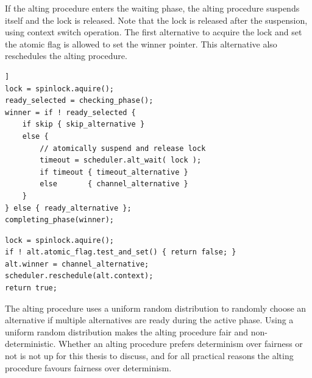 If the alting procedure enters the waiting phase, the alting procedure suspends itself and the lock is released. Note that the lock is released after the suspension, using context switch operation.  The first alternative to acquire the lock and set the atomic flag is allowed to set the winner pointer. This alternative also reschedules the alting procedure.

\begin{lstfloat}
\begin{lstlisting}[caption={Active alting of the alting procedure.}, label={lst:active_alting}, style={CustomC++}, xleftmargin={2em}]]
lock = spinlock.aquire();
ready_selected = checking_phase();
winner = if ! ready_selected {
    if skip { skip_alternative }
    else {
        // atomically suspend and release lock
        timeout = scheduler.alt_wait( lock );
        if timeout { timeout_alternative }
        else       { channel_alternative }
    }
} else { ready_alternative };
completing_phase(winner);
\end{lstlisting}
\end{lstfloat}

\begin{lstfloat}
\begin{lstlisting}[caption={Passive alting of a process.}, label={lst:passive_alting}, style={CustomC++}, xleftmargin={2em}]
lock = spinlock.aquire();
if ! alt.atomic_flag.test_and_set() { return false; }
alt.winner = channel_alternative;
scheduler.reschedule(alt.context);
return true;
\end{lstlisting}
\end{lstfloat}

The alting procedure uses a uniform random distribution to randomly choose an alternative if multiple alternatives are ready during the active phase. Using a uniform random distribution makes the alting procedure fair and non\hyp{}deterministic. Whether an alting procedure prefers determinism over fairness or not is not up for this thesis to discuss, and for all practical reasons the alting procedure favours fairness over determinism.

